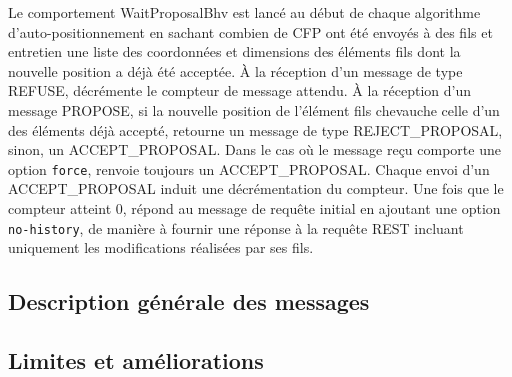 Le comportement WaitProposalBhv est lancé au début de chaque algorithme d'auto-positionnement en sachant combien de CFP ont été envoyés à des fils et entretien une liste des coordonnées et dimensions des éléments fils dont la nouvelle position a déjà été acceptée.
À la réception d'un message de type REFUSE, décrémente le compteur de message attendu.
À la réception d'un message PROPOSE, si la nouvelle position de l'élément fils chevauche celle d'un des éléments déjà accepté, retourne un message de type REJECT\_PROPOSAL, sinon, un ACCEPT\_PROPOSAL.
Dans le cas où le message reçu comporte une option \lstinline$force$, renvoie toujours un ACCEPT\_PROPOSAL.
Chaque envoi d'un ACCEPT\_PROPOSAL induit une décrémentation du compteur.
Une fois que le compteur atteint 0, répond au message de requête initial en ajoutant une option \lstinline$no-history$, de manière à fournir une réponse à la requête REST incluant uniquement les modifications réalisées par ses fils.

\subsection{Description générale des messages}

\subsection{Limites et améliorations}
